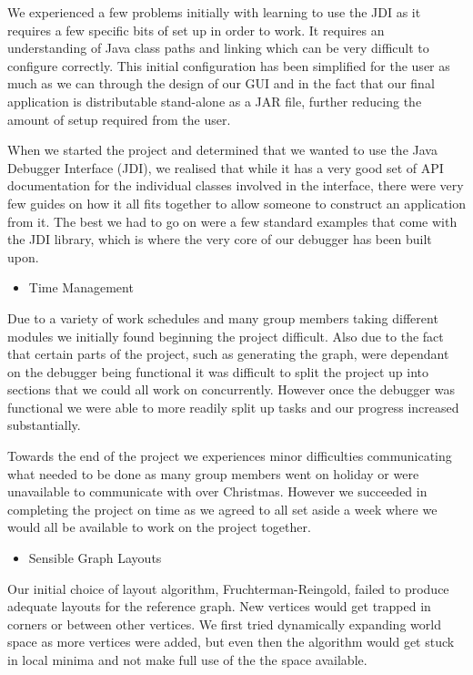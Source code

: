 \documentclass[11pt, a4paper]{report}
\begin{document}
We experienced a few problems initially with learning to use the JDI as it requires a few specific bits of set up in order to work. It requires an understanding of Java class paths and linking which can be very difficult to configure correctly. This initial configuration has been simplified for the user as much as we can through the design of our GUI and in the fact that our final application is distributable stand-alone as a JAR file, further reducing the amount of setup required from the user.

When we started the project and determined that we wanted to use the Java Debugger Interface (JDI), we realised that while it has a very good set of API documentation for the individual classes involved in the interface, there were very few guides on how it all fits together to allow someone to construct an application from it. The best we had to go on were a few standard examples that come with the JDI library, which is where the very core of our debugger has been built upon.

\begin{itemize}
  \item Time Management
\end{itemize}

Due to a variety of work schedules and many group members taking different modules we initially found beginning the project difficult. Also due to the fact that certain parts of the project, such as generating the graph, were dependant on the debugger being functional it was difficult to split the project up into sections that we could all work on concurrently. However once the debugger was functional we were able to more readily split up tasks and our progress increased substantially.

Towards the end of the project we experiences minor difficulties communicating what needed to be done as many group members went on holiday or were unavailable to communicate with over Christmas. However we succeeded in completing the project on time as we agreed to all set aside a week where we would all be available to work on the project together.

\begin{itemize}
  \item Sensible Graph Layouts
\end{itemize}

Our initial choice of layout algorithm, Fruchterman-Reingold, failed to produce adequate layouts for the reference graph. New vertices would get trapped in corners or between other vertices. We first tried dynamically expanding world space as more vertices were added, but even then the algorithm would get stuck in local minima and not make full use of the the space available. 
\end{document}
